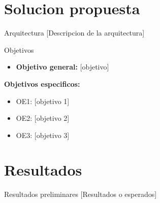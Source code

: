 \documentclass[aspectratio=169]{beamer}
\begin{document}
\section{Solucion propuesta}

\begin{frame}{Arquitectura}
    [Descripcion de la arquitectura]
\end{frame}

\begin{frame}{Objetivos}
    \begin{itemize}
        \item \textbf{Objetivo general:} [objetivo]
    \end{itemize}
    \vspace{0.5cm}
    \textbf{Objetivos especificos:}
    \begin{itemize}
        \item OE1: [objetivo 1]
        \item OE2: [objetivo 2]
        \item OE3: [objetivo 3]
    \end{itemize}
\end{frame}

\section{Resultados}

\begin{frame}{Resultados preliminares}
    [Resultados o esperados]
\end{frame}
\end{document}
